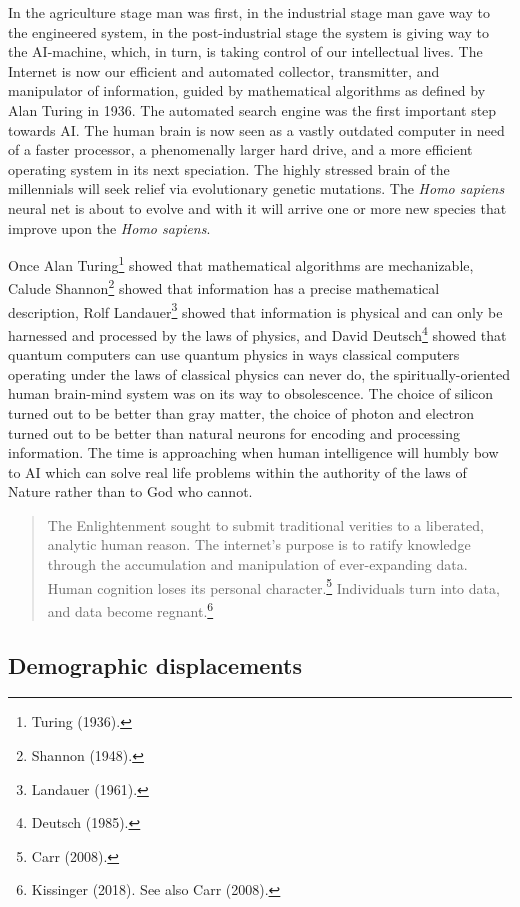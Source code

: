 \begin{multicols}{2}
In the agriculture stage man was first, in the industrial stage man gave way to the engineered system, in the post-industrial stage the system is giving way to the AI-machine, which, in turn, is taking control of our intellectual lives. The Internet is now our efficient and automated collector, transmitter, and manipulator of information, guided by mathematical algorithms as defined by Alan Turing in 1936. The automated search engine was the first important step towards AI. The human brain is now seen
as a vastly outdated computer in need of a faster processor, a phenomenally larger hard drive, and a more efficient operating system in its next speciation. The highly stressed brain of the millennials will seek relief via evolutionary genetic mutations. The \textit{Homo sapiens} neural net is about to evolve and with it will arrive one or more new species that improve upon the \textit{Homo sapiens}.

Once Alan Turing\footnote{Turing (1936).} showed that mathematical algorithms are mechanizable, Calude Shannon\footnote{Shannon (1948).} showed that information has a precise mathematical description, Rolf Landauer\footnote{Landauer (1961).}  showed that information is physical and can only be harnessed and processed by the laws of physics, and David Deutsch\footnote{Deutsch (1985).}  showed that quantum computers can use quantum physics in ways classical computers operating under the laws of classical physics can never do, the spiritually-oriented human brain-mind system was on its way to obsolescence. The choice of silicon turned out to be better than gray matter, the choice of photon and electron turned out to be better than natural neurons for encoding and processing information. The time is approaching when human intelligence will humbly bow to AI which can solve real life problems within the authority of the laws of Nature rather than to God who cannot.

\begin{quote}
The Enlightenment sought to submit traditional verities to a liberated, analytic human reason. The internet's purpose is to ratify knowledge through the accumulation and manipulation of ever-expanding data. Human cognition loses its personal character.\footnote{Carr (2008).} Individuals turn into data, and data become regnant.\footnote{Kissinger (2018). See also Carr (2008).}
\end{quote}

\subsection{Demographic displacements}


\end{multicols}
